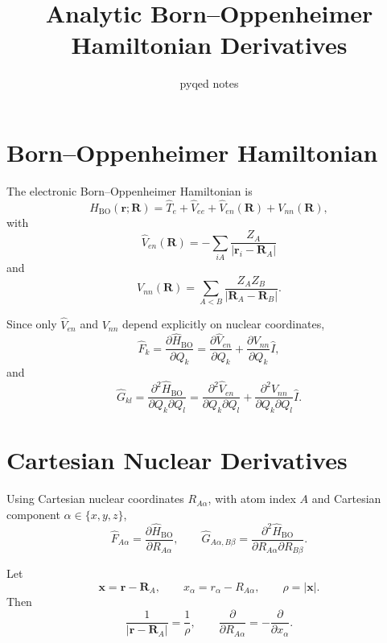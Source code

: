 \documentclass[11pt]{article}
\title{Analytic Born--Oppenheimer Hamiltonian Derivatives}
\author{pyqed notes}
\date{}
\begin{document}
\maketitle

\section*{Born--Oppenheimer Hamiltonian}

The electronic Born--Oppenheimer Hamiltonian is
\begin{equation}
\hat H_{\mathrm{BO}}(\bm r; \bm R)
=
\hat T_e + \hat V_{ee} + \hat V_{en}(\bm R) + V_{nn}(\bm R),
\end{equation}
with
\begin{equation}
\hat V_{en}(\bm R)= -\sum_{iA}\frac{Z_A}{|\bm r_i-\bm R_A|}
\end{equation}
and
\begin{equation}
V_{nn}(\bm R)=\sum_{A<B}\frac{Z_A Z_B}{|\bm R_A-\bm R_B|}.
\end{equation}

Since only $\hat V_{en}$ and $V_{nn}$ depend explicitly on nuclear coordinates,
\begin{equation}
\hat F_k
=
\frac{\partial \hat H_{\mathrm{BO}}}{\partial Q_k}
=
\frac{\partial \hat V_{en}}{\partial Q_k}
+
\frac{\partial V_{nn}}{\partial Q_k}\hat I,
\end{equation}
and
\begin{equation}
\hat G_{kl}
=
\frac{\partial^2 \hat H_{\mathrm{BO}}}{\partial Q_k \partial Q_l}
=
\frac{\partial^2 \hat V_{en}}{\partial Q_k \partial Q_l}
+
\frac{\partial^2 V_{nn}}{\partial Q_k \partial Q_l}\hat I.
\end{equation}

\section*{Cartesian Nuclear Derivatives}

Using Cartesian nuclear coordinates $R_{A\alpha}$, with atom index $A$ and
Cartesian component $\alpha \in \{x,y,z\}$,
\begin{equation}
\hat F_{A\alpha}
=
\frac{\partial \hat H_{\mathrm{BO}}}{\partial R_{A\alpha}},
\qquad
\hat G_{A\alpha,B\beta}
=
\frac{\partial^2 \hat H_{\mathrm{BO}}}
{\partial R_{A\alpha}\partial R_{B\beta}}.
\end{equation}

Let
\begin{equation}
\bm x = \bm r - \bm R_A,
\qquad
x_\alpha = r_\alpha - R_{A\alpha},
\qquad
\rho = |\bm x|.
\end{equation}
Then
\begin{equation}
\frac{1}{|\bm r-\bm R_A|} = \frac{1}{\rho},
\qquad
\frac{\partial}{\partial R_{A\alpha}} = -\frac{\partial}{\partial x_\alpha}.
\end{equation}
\end{document}
